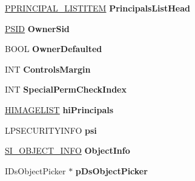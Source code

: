 \begin{DoxyCompactItemize}
\item 
\mbox{\label{struct___s_e_c_u_r_i_t_y___p_a_g_e_ab68505841a3331ccef977efe612fb6bd}} 
\hyperlink{struct___p_r_i_n_c_i_p_a_l___l_i_s_t_i_t_e_m}{P\+P\+R\+I\+N\+C\+I\+P\+A\+L\+\_\+\+L\+I\+S\+T\+I\+T\+EM} {\bfseries Principals\+List\+Head}
\item 
\mbox{\label{struct___s_e_c_u_r_i_t_y___p_a_g_e_a96fb46213a4d33357fb75b0211143348}} 
\hyperlink{struct___s_i_d}{P\+S\+ID} {\bfseries Owner\+Sid}
\item 
\mbox{\label{struct___s_e_c_u_r_i_t_y___p_a_g_e_a5acc20e17d6867fb4aed08b011e09ad4}} 
B\+O\+OL {\bfseries Owner\+Defaulted}
\item 
\mbox{\label{struct___s_e_c_u_r_i_t_y___p_a_g_e_a7395b9dabcc0bf943ed6afd64505a200}} 
I\+NT {\bfseries Controls\+Margin}
\item 
\mbox{\label{struct___s_e_c_u_r_i_t_y___p_a_g_e_a4a614b6f95b2ebfb60b3df289827f513}} 
I\+NT {\bfseries Special\+Perm\+Check\+Index}
\item 
\mbox{\label{struct___s_e_c_u_r_i_t_y___p_a_g_e_a1e55ef49358d13597e17ae2f82d2bdb1}} 
\hyperlink{struct___i_m_a_g_e_l_i_s_t}{H\+I\+M\+A\+G\+E\+L\+I\+ST} {\bfseries hi\+Principals}
\item 
\mbox{\label{struct___s_e_c_u_r_i_t_y___p_a_g_e_ac3a49498cfd7edd2d3c556559a3d5588}} 
L\+P\+S\+E\+C\+U\+R\+I\+T\+Y\+I\+N\+FO {\bfseries psi}
\item 
\mbox{\label{struct___s_e_c_u_r_i_t_y___p_a_g_e_a36b280d483bcdf17f5c5cdbe83583583}} 
\hyperlink{struct___s_i___o_b_j_e_c_t___i_n_f_o}{S\+I\+\_\+\+O\+B\+J\+E\+C\+T\+\_\+\+I\+N\+FO} {\bfseries Object\+Info}
\item 
\mbox{\label{struct___s_e_c_u_r_i_t_y___p_a_g_e_a959a12c5df611384455b4175c03a227c}} 
I\+Ds\+Object\+Picker $\ast$ {\bfseries p\+Ds\+Object\+Picker}
\item 

\end{DoxyCompactItemize}
